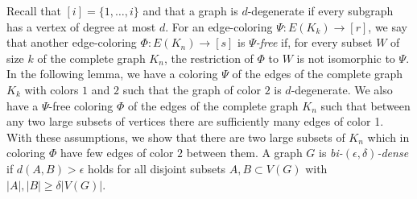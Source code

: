 \documentclass[11pt]{article}
\begin{document}
Recall that $[i]=\{1, \ldots, i\}$ and that a graph is $d$-degenerate if every subgraph has a
vertex of degree at most $d$. For an edge-coloring $\Psi:E(K_{k})\rightarrow [r]$, we say that
another edge-coloring $\Phi:E(K_{n})\rightarrow [s]$ is {\it
$\Psi$-free} if, for every subset $W$ of size $k$ of the complete graph $K_n$,
the restriction of $\Phi$ to $W$ is not isomorphic to
$\Psi$. In the following lemma, we have a coloring $\Psi$ of the
edges of the complete graph $K_k$ with colors $1$ and $2$ such that
the graph of color $2$ is $d$-degenerate. We also have a $\Psi$-free coloring
$\Phi$ of the edges of the complete graph $K_n$ such that between any two large subsets of vertices
there are sufficiently many edges of color 1. With these
assumptions, we show that there are two large subsets of $K_n$
which in coloring $\Phi$ have few edges of color $2$ between them. A graph $G$ is {\it
bi-$(\epsilon,\delta)$-dense} if $d(A,B)>\epsilon$ holds for all
disjoint subsets $A,B \subset V(G)$ with $|A|,|B| \geq \delta
|V(G)|$.
\end{document}
